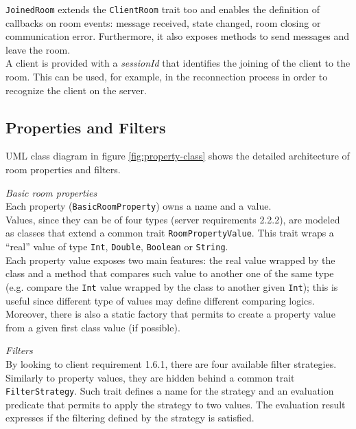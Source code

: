 \bigskip
\texttt{JoinedRoom} extends the \texttt{ClientRoom} trait too and enables the definition of callbacks on room events: message received, state changed, room closing or communication error.
Furthermore, it also exposes methods to send messages and leave the room.
\\
A client is provided with a \textit{sessionId} that identifies the joining of the client to the room.
This can be used, for example, in the reconnection process in order to recognize the client on the server.


\subsection{Properties and Filters}  \label{room_properties_section}
UML class diagram in figure \ref{fig:property-class} shows the detailed architecture of room properties and filters.

\bigskip
\textit{Basic room properties}
\\
Each property (\texttt{BasicRoomProperty}) owns a name and a value.
\\
Values, since they can be of four types (server requirements 2.2.2), are modeled as classes that extend a common trait \texttt{RoomPropertyValue}. This trait wraps a ``real'' value of type \texttt{Int}, \texttt{Double}, \texttt{Boolean} or \texttt{String}.
\\
Each property value exposes two main features: the real value wrapped by the class and a method that compares such value to another one of the same type (e.g. compare the \texttt{Int} value wrapped by the class to another given \texttt{Int}); this is useful since different type of values may define different comparing logics.
Moreover, there is also a static factory that permits to create a property value from a given first class value (if possible).

\bigskip
\textit{Filters}
\\
By looking to client requirement 1.6.1, there are four available filter strategies. Similarly to property values, they are hidden behind a common trait \texttt{FilterStrategy}. Such trait defines a name for the strategy and an evaluation predicate that permits to apply the strategy to two values. The evaluation result expresses if the filtering defined by the strategy is satisfied.

